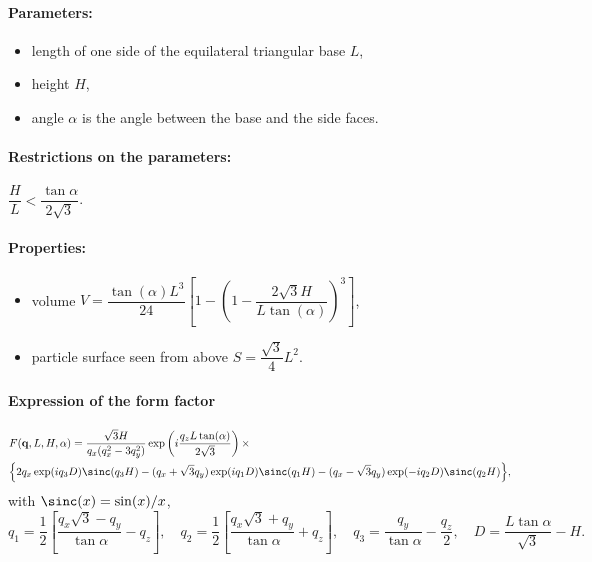 \FloatBarrier

\paragraph{Parameters:}
\begin{itemize}
\item length of one side of the equilateral triangular base $L$,
\item height $H$,
\item angle $\alpha$ is the angle between the base and the
  side faces.
\end{itemize}

\paragraph{Restrictions on the parameters:} 
$\dfrac{H}{L}< \dfrac{\tan{\alpha}}{2\sqrt{3}}$.

\paragraph{Properties:}
\begin{itemize}
\item volume $V= \dfrac{\tan(\alpha) L^3}{24} \left[1- \left(1 -
  \dfrac{2\sqrt{3} H}{L \tan(\alpha)} \right)^3\right]$,
\item particle surface seen from above $S =\dfrac{\sqrt{3}}{4}L^2$.
\end{itemize}

\paragraph{Expression of the form factor}

\begin{align*}
&F(\mathbf{q}, L, H, \alpha)=\frac{\sqrt{3}H}{q_x (q_x^2-3q_y^2)}
\exp\left(i\frac{q_z L\tan (\alpha)}{2\sqrt{3}}\right) \times \\
&\Big\{2q_x \exp(iq_3 D)\sinc(q_3 H) - (q_x +\sqrt{3}q_y)
\exp(iq_1 D)\sinc(q_1 H) -(q_x-\sqrt{3}q_y)\exp(-iq_2
D)\sinc(q_2 H) \Big\}, 
\end{align*}
with $\sinc(x)=\sin(x)/x$,
\begin{equation*}
q_1  =\frac{1}{2}\left[\frac{q_x\sqrt{3} -q_y}{\tan \alpha}-q_z \right],
\quad q_2 = \frac{1}{2}\left[\frac{q_x\sqrt{3} +q_y}{\tan \alpha}+q_z
\right], \quad 
q_3 = \frac{q_y}{\tan \alpha} -\frac{q_z}{2}, \quad D = \frac{L \tan \alpha}{\sqrt{3}} -H.
\end{equation*}


